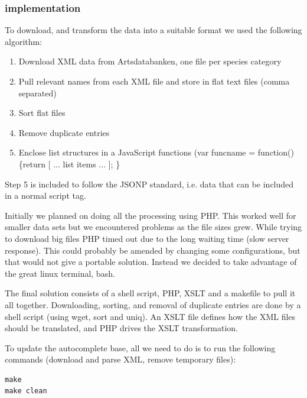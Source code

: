 	\subsubsection{implementation}
		To download, and transform the data into a suitable format we used the
		following algorithm:

		\begin{enumerate}
			\item Download XML data from Artsdatabanken, one file per species category
			\item Pull relevant names from each XML file and store in flat text files (comma separated)
			\item Sort flat files
			\item Remove duplicate entries
			\item Enclose list structures in a JavaScript functions (var
			funcname = function() \{return [ ... list items ... ]; \}
		\end{enumerate}

		Step 5 is included to follow the JSONP standard, i.e. data
		that can be included in a normal script tag.

		Initially we planned on doing all the processing using PHP. This worked
		well for smaller data sets but we encountered problems as the file
		sizes grew. While trying to download big files PHP timed out due to the
		long waiting time (slow server response). This could probably be
		amended by changing some configurations, but that would not give a
		portable solution. Instead we decided to take advantage of the great
		linux terminal, bash.

		The final solution consists of a shell script, PHP, XSLT and a makefile
		to pull it all together.  Downloading, sorting, and removal of
		duplicate entries are done by a shell script (using wget, sort and
		uniq). An XSLT file defines how the XML files should be translated, and
		PHP drives the XSLT transformation.

		To update the autocomplete base, all we need to do is to run the
		following commands (download and parse XML, remove temporary files):
\begin{lstlisting}
make
make clean
\end{lstlisting}

